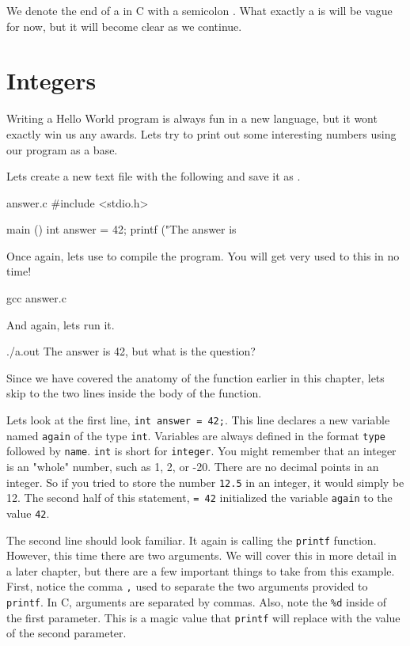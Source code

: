 We denote the end of a  in C with a semicolon \ident{;}.  What
exactly a  is will be vague for now, but it will become
clear as we continue.

\section{Integers}

Writing a Hello World program is always fun in a new language, but it wont
exactly win us any awards. Lets try to print out some interesting numbers
using our program as a base.

Lets create a new text file with the following and save it as .

\begin{code}{answer.c}
#include <stdio.h>

main ()
{
    int answer = 42;
    printf ("The answer is %
}
\end{code}

Once again, lets use  to compile the program. You will get very
used to this in no time!

\begin{Terminal}
gcc answer.c
\end{Terminal}

And again, lets run it.

\begin{Terminal}
./a.out
The answer is 42, but what is the question?
\end{Terminal}

Since we have covered the anatomy of the  function earlier in this
chapter, lets skip to the two lines inside the body of the function.

Lets look at the first line, \verb|int answer = 42;|. This line declares a new
variable named \verb|again| of the type \verb|int|. Variables are always
defined in the format \verb|type| followed by \verb|name|. \verb|int| is short
for \verb|integer|.  You might remember that an integer is an "whole" number,
such as 1, 2, or -20.  There are no decimal points in an integer. So if you
tried to store the number \verb|12.5| in an integer, it would simply be 12. The
second half of this statement, \verb|= 42| initialized the variable
\verb|again| to the value \verb|42|.

The second line should look familiar. It again is calling the \verb|printf|
function. However, this time there are two arguments. We will cover this in
more detail in a later chapter, but there are a few important things to take
from this example. First, notice the comma \verb|,| used to separate the
two arguments provided to \verb|printf|. In C, arguments are separated by
commas. Also, note the \verb|%d| inside of the first parameter. This is a
magic value that \verb|printf| will replace with the value of the second
parameter.

